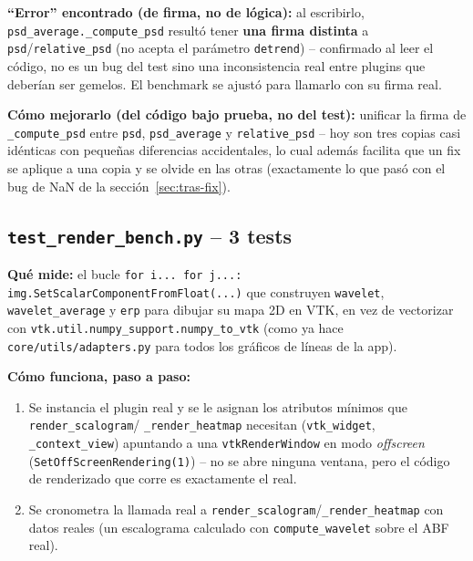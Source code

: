 \documentclass[11pt,a4paper]{article}
\begin{document}
\textbf{``Error'' encontrado (de firma, no de lógica):} al escribirlo, \texttt{psd\_\allowbreak average.\_\allowbreak compute\_\allowbreak psd}
resultó tener \textbf{una firma distinta} a \texttt{psd}/\texttt{relative\_\allowbreak psd} (no acepta el parámetro
\texttt{detrend}) -- confirmado al leer el código, no es un bug del test sino una inconsistencia real entre
plugins que deberían ser gemelos. El benchmark se ajustó para llamarlo con su firma real.

\textbf{Cómo mejorarlo (del código bajo prueba, no del test):} unificar la firma de \texttt{\_\allowbreak compute\_\allowbreak psd}
entre \texttt{psd}, \texttt{psd\_\allowbreak average} y \texttt{relative\_\allowbreak psd} -- hoy son tres copias casi idénticas con
pequeñas diferencias accidentales, lo cual además facilita que un fix se aplique a una copia y se olvide en
las otras (exactamente lo que pasó con el bug de NaN de la sección~\ref{sec:tras-fix}).

\subsection{\texttt{test\_\allowbreak render\_\allowbreak bench.py} -- 3 tests}

\textbf{Qué mide:} el bucle \texttt{for i... for j...: img.SetScalarComponentFromFloat(...)} que construyen
\texttt{wavelet}, \texttt{wavelet\_\allowbreak average} y \texttt{erp} para dibujar su mapa 2D en VTK, en vez de
vectorizar con \texttt{vtk.util.numpy\_\allowbreak support.numpy\_\allowbreak to\_\allowbreak vtk} (como ya hace
\texttt{core/utils/adapters.py} para todos los gráficos de líneas de la app).

\textbf{Cómo funciona, paso a paso:}
\begin{enumerate}
  \item Se instancia el plugin real y se le asignan los atributos mínimos que \texttt{render\_\allowbreak scalogram}/
        \texttt{\_\allowbreak render\_\allowbreak heatmap} necesitan (\texttt{vtk\_\allowbreak widget}, \texttt{\_\allowbreak context\_\allowbreak view}) apuntando a
        una \texttt{vtkRenderWindow} en modo \textit{offscreen} (\texttt{SetOffScreenRendering(1)}) -- no se
        abre ninguna ventana, pero el código de renderizado que corre es exactamente el real.
  \item Se cronometra la llamada real a \texttt{render\_\allowbreak scalogram}/\texttt{\_\allowbreak render\_\allowbreak heatmap} con datos
        reales (un escalograma calculado con \texttt{compute\_\allowbreak wavelet} sobre el ABF real).
\end{enumerate}
\end{document}
